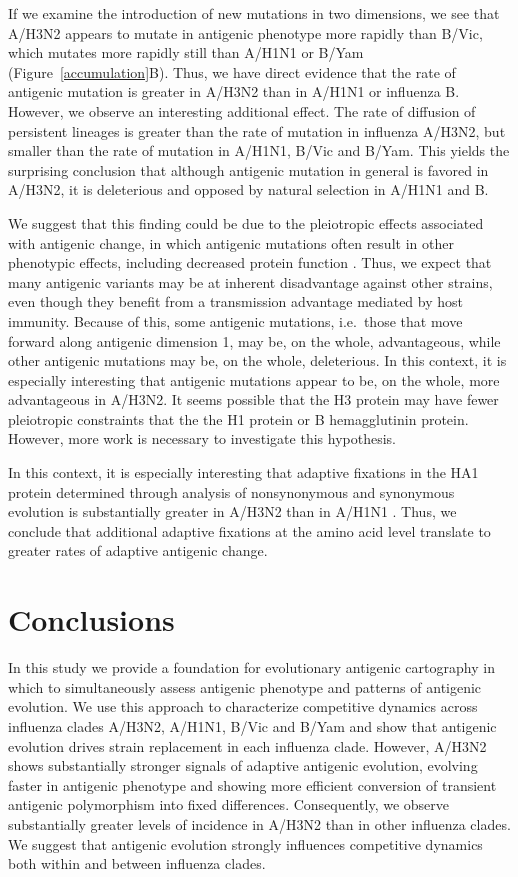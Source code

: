 \documentclass[11pt,oneside,letterpaper]{article}
\begin{document}
If we examine the introduction of new mutations in two dimensions, we see that A/H3N2 appears to mutate in antigenic phenotype more rapidly than B/Vic, which mutates more rapidly still than A/H1N1 or B/Yam (Figure~\ref{accumulation}B).
Thus, we have direct evidence that the rate of antigenic mutation is greater in A/H3N2 than in A/H1N1 or influenza B.
However, we observe an interesting additional effect.
The rate of diffusion of persistent lineages is greater than the rate of mutation in influenza A/H3N2, but smaller than the rate of mutation in A/H1N1, B/Vic and B/Yam.
This yields the surprising conclusion that although antigenic mutation in general is favored in A/H3N2, it is deleterious and opposed by natural selection in A/H1N1 and B.

We suggest that this finding could be due to the pleiotropic effects associated with antigenic change, in which antigenic mutations often result in other phenotypic effects, including decreased protein function \cite{Kaverin04,Rudneva12}.
Thus, we expect that many antigenic variants may be at inherent disadvantage against other strains, even though they benefit from a transmission advantage mediated by host immunity.
Because of this, some antigenic mutations, i.e.\ those that move forward along antigenic dimension 1, may be, on the whole, advantageous, while other antigenic mutations may be, on the whole, deleterious.
In this context, it is especially interesting that antigenic mutations appear to be, on the whole, more advantageous in A/H3N2.
It seems possible that the H3 protein may have fewer pleiotropic constraints that the the H1 protein or B hemagglutinin protein.
However, more work is necessary to investigate this hypothesis.

In this context, it is especially interesting that adaptive fixations in the HA1 protein determined through analysis of nonsynonymous and synonymous evolution is substantially greater in A/H3N2 than in A/H1N1 \cite{Wolf06, Bhatt11}.
Thus, we conclude that additional adaptive fixations at the amino acid level translate to greater rates of adaptive antigenic change. 

\section*{Conclusions}

In this study we provide a foundation for evolutionary antigenic cartography in which to simultaneously assess antigenic phenotype and patterns of antigenic evolution.
We use this approach to characterize competitive dynamics across influenza clades A/H3N2, A/H1N1, B/Vic and B/Yam and show that antigenic evolution drives strain replacement in each influenza clade.
However, A/H3N2 shows substantially stronger signals of adaptive antigenic evolution, evolving faster in antigenic phenotype and showing more efficient conversion of transient antigenic polymorphism into fixed differences.
Consequently, we observe substantially greater levels of incidence in A/H3N2 than in other influenza clades.
We suggest that antigenic evolution strongly influences competitive dynamics both within and between influenza clades.
\end{document}
